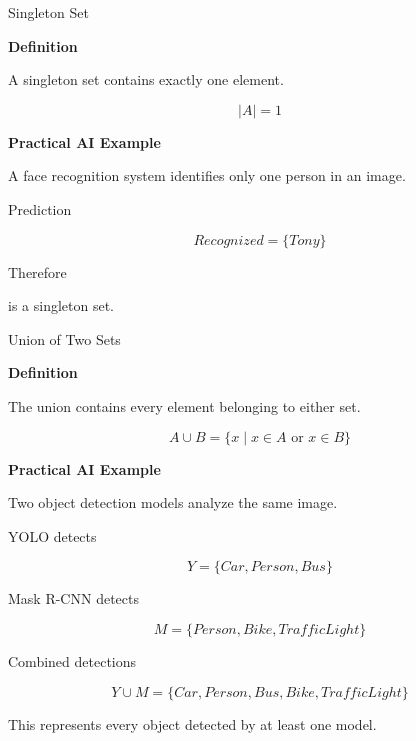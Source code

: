 \documentclass[aspectratio=169]{beamer}
\begin{document}
\begin{frame}{Singleton Set}

\textbf{Definition}

A singleton set contains exactly one element.

\[
|A|=1
\]



\vspace{0.2cm}

\textbf{Practical AI Example}

A face recognition system identifies only one person in an image.

Prediction

\[
Recognized=
\{Tony\}
\]

Therefore



is a singleton set.

\end{frame}

\begin{frame}{Union of Two Sets}

\textbf{Definition}

The union contains every element belonging to either set.

\[
A\cup B
=
\{x \mid x\in A \text{ or } x\in B\}
\]

\vspace{0.4cm}

\textbf{Practical AI Example}

Two object detection models analyze the same image.

YOLO detects

\[
Y=
\{
Car,
Person,
Bus
\}
\]

Mask R-CNN detects

\[
M=
\{
Person,
Bike,
TrafficLight
\}
\]

Combined detections

\[
Y\cup M
=
\{
Car,
Person,
Bus,
Bike,
TrafficLight
\}
\]

\vspace{0.3cm}

This represents every object detected by at least one model.

\vspace{0.2cm}

\begin{center}
\end{center}

\end{frame}
\end{document}
